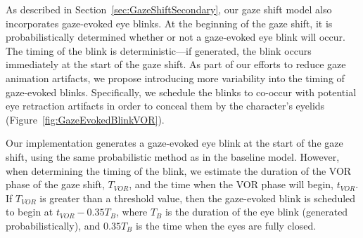 As described in Section~\ref{sec:GazeShiftSecondary}, our gaze shift model also incorporates gaze-evoked eye blinks. At the beginning of the gaze shift, it is probabilistically determined whether or not a gaze-evoked eye blink will occur.
The timing of the blink is deterministic---if generated, the blink occurs immediately at the start of the gaze shift.
As part of our efforts to reduce gaze animation artifacts, we propose introducing more variability into the timing of gaze-evoked blinks. Specifically, we schedule the blinks to co-occur with potential eye retraction artifacts in order to conceal them by the character's eyelids (Figure~\ref{fig:GazeEvokedBlinkVOR}).

Our implementation generates a gaze-evoked eye blink at the start of the gaze shift, using the same probabilistic method as in the baseline model. However, when determining the timing of the blink, we estimate the duration of the VOR phase of the gaze shift, $T_{VOR}$, and the time when the VOR phase will begin, $t_{VOR}$. If $T_{VOR}$ is greater than a threshold value, then the gaze-evoked blink is scheduled to begin at $t_{VOR} - 0.35T_{B}$, where $T_B$ is the duration of the eye blink (generated probabilistically), and $0.35T_B$ is the time when the eyes are fully closed.

